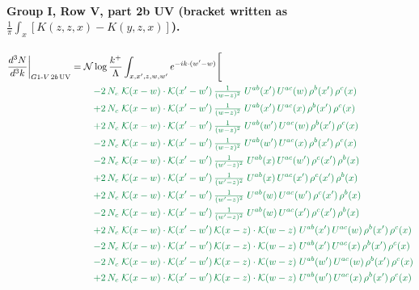 \documentclass[10pt]{article}
\numberwithin{equation}{section}
\newcommand{\NN}{\mathcal N\log\frac{k^+}{\Lambda}}
\begin{document}
\paragraph{Group I, Row V, part 2b UV (bracket written as $\frac1\pi\int_x[K(z,z,x)-K(y,z,x)]$).}
\begin{align}
\frac{d^3N}{d^3k}\bigg|_{G1\text{-}V\,2b\,{\rm UV}}={}&\NN\int_{x,x',z,w,w'}e^{-ik\cdot(w'-w)}\Bigg[\notag\\
&\quad{\color{JIM}-2\,N_c\;\mathcal{K}(x-w)\cdot\mathcal{K}(x'-w')\,\tfrac{1}{(w-z)^{2}}\;U^{ab}(x')\,U^{ac}(w)\,\rho^{b}(x')\,\rho^{c}(x)}\notag\\
&\quad{\color{JIM}+2\,N_c\;\mathcal{K}(x-w)\cdot\mathcal{K}(x'-w')\,\tfrac{1}{(w-z)^{2}}\;U^{ab}(x')\,U^{ac}(x)\,\rho^{b}(x')\,\rho^{c}(x)}\notag\\
&\quad{\color{JIM}+2\,N_c\;\mathcal{K}(x-w)\cdot\mathcal{K}(x'-w')\,\tfrac{1}{(w-z)^{2}}\;U^{ab}(w')\,U^{ac}(w)\,\rho^{b}(x')\,\rho^{c}(x)}\notag\\
&\quad{\color{JIM}-2\,N_c\;\mathcal{K}(x-w)\cdot\mathcal{K}(x'-w')\,\tfrac{1}{(w-z)^{2}}\;U^{ab}(w')\,U^{ac}(x)\,\rho^{b}(x')\,\rho^{c}(x)}\notag\\
&\quad{\color{JIM}-2\,N_c\;\mathcal{K}(x-w)\cdot\mathcal{K}(x'-w')\,\tfrac{1}{(w'-z)^{2}}\;U^{ab}(x)\,U^{ac}(w')\,\rho^{c}(x')\,\rho^{b}(x)}\notag\\
&\quad{\color{JIM}+2\,N_c\;\mathcal{K}(x-w)\cdot\mathcal{K}(x'-w')\,\tfrac{1}{(w'-z)^{2}}\;U^{ab}(x)\,U^{ac}(x')\,\rho^{c}(x')\,\rho^{b}(x)}\notag\\
&\quad{\color{JIM}+2\,N_c\;\mathcal{K}(x-w)\cdot\mathcal{K}(x'-w')\,\tfrac{1}{(w'-z)^{2}}\;U^{ab}(w)\,U^{ac}(w')\,\rho^{c}(x')\,\rho^{b}(x)}\notag\\
&\quad{\color{JIM}-2\,N_c\;\mathcal{K}(x-w)\cdot\mathcal{K}(x'-w')\,\tfrac{1}{(w'-z)^{2}}\;U^{ab}(w)\,U^{ac}(x')\,\rho^{c}(x')\,\rho^{b}(x)}\notag\\
&\quad{\color{JIM}+2\,N_c\;\mathcal{K}(x-w)\cdot\mathcal{K}(x'-w')\,\mathcal{K}(x-z)\cdot\mathcal{K}(w-z)\;U^{ab}(x')\,U^{ac}(w)\,\rho^{b}(x')\,\rho^{c}(x)}\notag\\
&\quad{\color{JIM}-2\,N_c\;\mathcal{K}(x-w)\cdot\mathcal{K}(x'-w')\,\mathcal{K}(x-z)\cdot\mathcal{K}(w-z)\;U^{ab}(x')\,U^{ac}(x)\,\rho^{b}(x')\,\rho^{c}(x)}\notag\\
&\quad{\color{JIM}-2\,N_c\;\mathcal{K}(x-w)\cdot\mathcal{K}(x'-w')\,\mathcal{K}(x-z)\cdot\mathcal{K}(w-z)\;U^{ab}(w')\,U^{ac}(w)\,\rho^{b}(x')\,\rho^{c}(x)}\notag\\
&\quad{\color{JIM}+2\,N_c\;\mathcal{K}(x-w)\cdot\mathcal{K}(x'-w')\,\mathcal{K}(x-z)\cdot\mathcal{K}(w-z)\;U^{ab}(w')\,U^{ac}(x)\,\rho^{b}(x')\,\rho^{c}(x)}\notag\\

\end{align}
\end{document}
